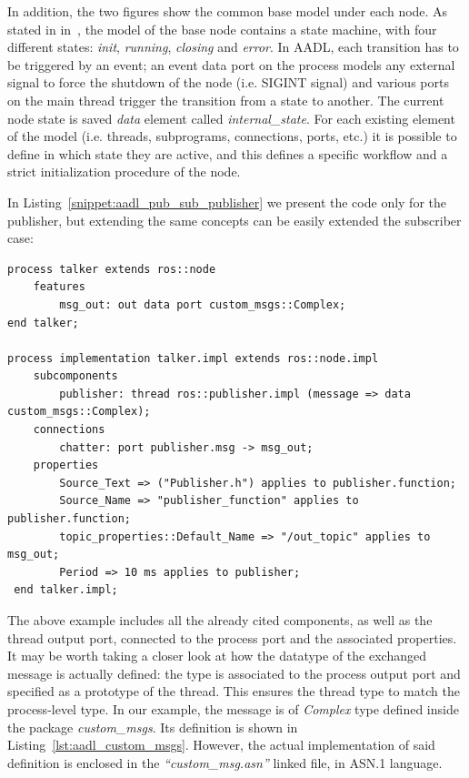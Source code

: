 In addition, the two figures show the common base model under each node. As stated in in~\cite{Bardaro2017}, the model of the base node contains a state machine, with four different states: \textit{init}, \textit{running}, \textit{closing} and \textit{error}. In AADL, each transition has to be triggered by an event; an event data port on the process models any external signal to force the shutdown of the node (i.e. SIGINT signal) and various ports on the main thread trigger the transition from a state to another. The current node state is saved \textit{data} element called \textit{internal\_state}. For each existing element of the model (i.e. threads, subprograms, connections, ports, etc.) it is possible to define in which state they are active, and this defines a specific workflow and a strict initialization procedure of the node.

In Listing~\ref{snippet:aadl_pub_sub_publisher} we present the code only for the publisher, but extending the same concepts can be easily extended the subscriber case:

\begin{lstlisting}[frame=tb,caption={AADL model for a simple process (node) implementing a publisher feature},label=snippet:aadl_pub_sub_publisher]
process talker extends ros::node
	features
 		msg_out: out data port custom_msgs::Complex;
end talker;

process implementation talker.impl extends ros::node.impl
 	subcomponents
 		publisher: thread ros::publisher.impl (message => data custom_msgs::Complex);
 	connections
 		chatter: port publisher.msg -> msg_out;
 	properties
 		Source_Text => ("Publisher.h") applies to publisher.function;
 		Source_Name => "publisher_function" applies to publisher.function;
 		topic_properties::Default_Name => "/out_topic" applies to msg_out;
 		Period => 10 ms applies to publisher;
 end talker.impl;
 \end{lstlisting}

The above example includes all the already cited components, as well as the thread output port, connected to the process port and the associated properties. It may be worth taking a closer look at how the datatype of the exchanged message is actually defined: the type is associated to the process output port and specified as a prototype of the thread. This ensures the thread type to match the process-level type.
In our example, the message is of \textit{Complex} type defined inside the package \textit{custom\_msgs}. Its definition is shown in Listing~\ref{lst:aadl_custom_msgs}. However, the actual implementation of said definition is enclosed in the \textit{``custom\_msg.asn''} linked file, in ASN.1 language.

